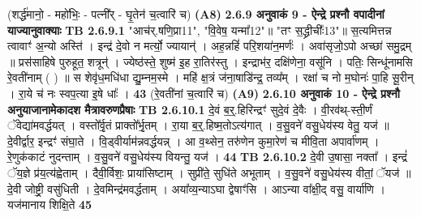 \documentclass[17pt]{extarticle}
\begin{document}
                  \newline
                                    (शर्द्ध॑मानो॒ - महो॑भिः॒ - पत्नी᳚र् - घृ॒तेन॑ च॒त्वारि॑ च) \textbf{(A8)} \newline \newline
                \textbf{ 2.6.9     अनुवाकं   9 - ऐन्द्रे प्रश्नौ वपादीनां याज्यानुवाक्याः} \newline
                                \textbf{ TB 2.6.9.1} \newline
                  "आच॑र्.षणि॒प्रा{11}", "वि॒वेष॒ यन्मा᳚{12}"॥ "तꣳ स॒द्ध्रीचीः᳚{13}"॥ स॒त्यमित्तन्न त्वावाꣳ॑ अ॒न्यो अस्ति॑ । इन्द्र॑ दे॒वो न मर्त्यो॒ ज्यायान्॑ । अह॒न्नहिं॑ परि॒शया॑न॒मर्णः॑ । अवा॑सृजो॒ऽपो अच्छा॑ समु॒द्रम् ॥ प्रस॑साहिषे पुरुहूत॒ शत्रून्॑ । ज्येष्ठ॑स्ते॒ शुष्म॑ इ॒ह रा॒तिर॑स्तु । इन्द्राभ॑र॒ दक्षि॑णेना॒ वसू॑नि । पतिः॒ सिन्धू॑नामसि रे॒वती॑नाम् ( ) ॥ स शेवृ॑ध॒मधि॑धा द्यु॒म्नम॒स्मे । महि॑ क्ष॒त्रं ज॑ना॒षाडि॑न्द्र॒ तव्य᳚म् । रक्षा॑ च नो म॒घोनः॑ पा॒हि सू॒रीन् । रा॒ये च॑ नः स्वप॒त्या इ॒षे धाः᳚ । \textbf{ 43} \newline
                  \newline
                                    (रे॒वती॑नां च॒त्वारि॑ च) \textbf{(A9)} \newline \newline
                \textbf{ 2.6.10    अनुवाकं   10 - ऐन्द्रे प्रश्नौ अनुयाजानामेकादश मैत्रावरुणप्रैषाः} \newline
                                \textbf{ TB 2.6.10.1} \newline
                  दे॒वं ब॒र्॒.हिरिन्द्रꣳ॑ सुदे॒वं दे॒वैः । वी॒रव॑थ्-स्ती॒र्णं ॅवेद्या॑मवर्द्धयत् । वस्तो᳚र्वृ॒तं प्राक्तो᳚र्भृ॒तम् । रा॒या ब॒र्॒.हिष्म॒तोऽत्य॑गात् । व॒सु॒वने॑ वसु॒धेय॑स्य वेतु॒ यज॑ ॥ दे॒वीर्द्वार॒ इन्द्रꣳ॑ संघा॒ते । वि॒ड्वीर्याम॑न्नवर्द्धयन्न् । आ व॒थ्सेन॒ तरु॑णेन कुमा॒रेण॑ च मीवि॒ता अपार्वा॑णम् । रे॒णुक॑काटं नुदन्ताम् । व॒सु॒वने॑ वसु॒धेय॑स्य वियन्तु॒ यज॑ । \textbf{ 44} \newline
                  \newline
                                \textbf{ TB 2.6.10.2} \newline
                  दे॒वी उ॒षासा॒ नक्ता᳚ । इन्द्रं॑ ॅय॒ज्ञे प्र॑य॒त्य॑ह्वेताम् । दैवी॒र्विशः॒ प्राया॑सिष्टाम् । सुप्री॑ते॒ सुधि॑ते अभूताम् । व॒सु॒वने॑ वसु॒धेय॑स्य वीतां॒ ॅयज॑ ॥ दे॒वी जोष्ट्री॒ वसु॑धिती । दे॒वमिन्द्र॑मवर्द्धताम् । अया᳚व्य॒न्याऽघा द्वेषाꣳ॑सि । आऽन्या वा᳚क्षी॒द् वसु॒ वार्या॑णि । यज॑मानाय शिक्षि॒ते \textbf{ 45} \newline
                  \newline
\end{document}
